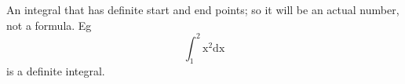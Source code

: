   An integral that has definite start and end points; so it will be an actual number,
not a formula. Eg \[ \displaystyle{\int_{1}^{2}} \mathrm{x}^2 \mathrm{dx} \] is a definite integral.